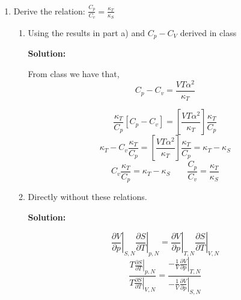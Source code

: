 \documentclass[10pt]{article}
\newenvironment{Solution}
    {\textbf{Solution:}
    
    \vspace{5mm}
    \begin{tcolorbox}
    }
    {
    \end{tcolorbox}
    \vspace{5mm}
    }
\begin{document}
\begin{enumerate}
\begin{enumerate}
\begin{Solution}
\end{Solution}

\item Derive the relation: $\frac{C_{p}}{C_{v}}=\frac{\kappa_{T}}{\kappa_{S}}$
\begin{enumerate}
\item Using the results in part a) and $C_{p}-C_{V}$ derived in class

\begin{Solution}
From class we have that, 
\begin{equation}
    C_p -C_v = \frac{VT \alpha^2}{\kappa_T}
\end{equation}

\begin{equation}
    \frac{\kappa_T}{C_p}\left[C_p -C_v\right] = \left[\frac{VT \alpha^2}{\kappa_T}\right]\frac{\kappa_T}{C_p}
\end{equation}
\begin{equation}
    \kappa_T -C_v\frac{\kappa_T}{C_p} = \left[\frac{VT \alpha^2}{\kappa_T}\right]\frac{\kappa_T}{C_p} = \kappa_{T}-\kappa_{S}
\end{equation}
\begin{equation}
    C_v\frac{\kappa_T}{C_p} = \kappa_{T}-\kappa_{S}\qquad \boxed{\frac{C_{p}}{C_{v}}=\frac{\kappa_{T}}{\kappa_{S}}}
\end{equation}

\end{Solution}

\item Directly without these relations.

\begin{Solution}

\begin{equation}
    {\left.\frac{\partial V}{\partial p}\right|_{S,N}}{\left.\frac{\partial S}{\partial T}\right|_{p,N}} = {\left.\frac{\partial V}{\partial p}\right|_{T,N}}{\left.\frac{\partial S}{\partial T}\right|_{V,N}}
\end{equation}
\begin{equation}
    \frac{T\left.\frac{\partial S}{\partial T}\right|_{p,N}}{T\left.\frac{\partial S}{\partial T}\right|_{V,N}} = \frac{- \frac{1}{V}\left.\frac{\partial V}{\partial p}\right|_{T,N}}{- \frac{1}{V}\left.\frac{\partial V}{\partial p}\right|_{S,N}}
\end{equation}
\end{Solution}
\end{enumerate}

\end{enumerate}
\newpage


\end{enumerate}
\end{document}
